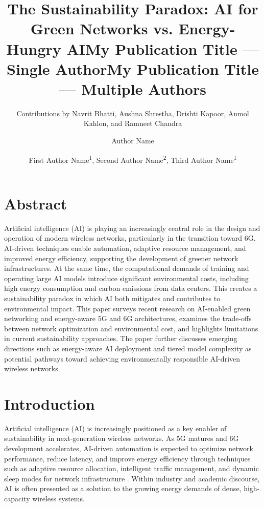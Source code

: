 \documentclass[letterpaper]{article} %
\title{The Sustainability Paradox: AI for\\ Green Networks vs. Energy-Hungry AI{}}
\author{
    Contributions by Navrit Bhatti,
    Aushna Shrestha, 
    Drishti Kapoor, 
    Anmol Kahlon, and
    Ramneet Chandra
}
\title{My Publication Title --- Single Author}
\author {
    Author Name
}
\title{My Publication Title --- Multiple Authors}
\author {
    First Author Name\textsuperscript{\rm 1},
    Second Author Name\textsuperscript{\rm 2},
    Third Author Name\textsuperscript{\rm 1}
}
\begin{document}
\maketitle

\section{Abstract}
Artificial intelligence (AI) is playing an increasingly central role in the design and operation of modern wireless networks, particularly in the transition toward 6G. AI-driven techniques enable automation, adaptive resource management, and improved energy efficiency, supporting the development of greener network infrastructures. At the same time, the computational demands of training and operating large AI models introduce significant environmental costs, including high energy consumption and carbon emissions from data centers. This creates a sustainability paradox in which AI both mitigates and contributes to environmental impact. This paper surveys recent research on AI-enabled green networking and energy-aware 5G and 6G architectures, examines the trade-offs between network optimization and environmental cost, and highlights limitations in current sustainability approaches. The paper further discusses emerging directions such as energy-aware AI deployment and tiered model complexity as potential pathways toward achieving environmentally responsible AI-driven wireless networks.

\section{Introduction}
Artificial intelligence (AI) is increasingly positioned as a key enabler of sustainability in next-generation wireless networks. As 5G matures and 6G development accelerates, AI-driven automation is expected to optimize network performance, reduce latency, and improve energy efficiency through techniques such as adaptive resource allocation, intelligent traffic management, and dynamic sleep modes for network infrastructure \cite{alhussien_toward_2024, ezzeddine_survey_2024}. Within industry and academic discourse, AI is often presented as a solution to the growing energy demands of dense, high-capacity wireless systems.
\end{document}
